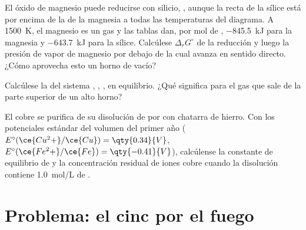 \begin{exercise}[$\star\star\star$]\label{exo:b2:ellingham:10}
El óxido de magnesio puede reducirse con silicio, , aunque
la recta de la sílice está por encima de la de la magnesia a todas las temperaturas del
diagrama. A \qty{1500}{K}, el magnesio es un gas y las tablas dan, por mol de
, \qty{-845.5}{kJ} para la magnesia y \qty{-643.7}{kJ} para la sílice.
Calcúlese $\Delta_r G^\circ$ de la reducción y luego la presión de vapor de
magnesio por debajo de la cual avanza en sentido directo. ¿Cómo aprovecha esto un horno de vacío?
\end{exercise}

\begin{exercise}[$\star\star\star$]\label{exo:b2:ellingham:11}
Calcúlese la  del sistema , , ,
 en equilibrio. ¿Qué significa para el gas que sale de la parte superior
de un alto horno?
\end{exercise}

\begin{exercise}[$\star\star\star$]\label{exo:b2:ellingham:12}
El cobre se purifica de su disolución de  por  con chatarra de hierro.
Con los potenciales estándar del volumen del primer año ($E^\circ(\ce{Cu^2+}/\ce{Cu})
= \qty{0.34}{V}$, $E^\circ(\ce{Fe^2+}/\ce{Fe}) = \qty{-0.41}{V}$), calcúlense la
constante de equilibrio de  y la concentración
residual de iones cobre cuando la disolución contiene \qty{1.0}{mol/L} de
.
\end{exercise}

\section{Problema: el cinc por el fuego}

